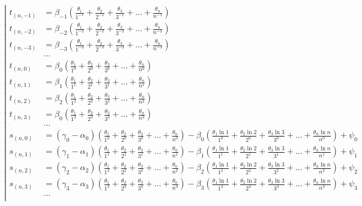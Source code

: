 \begin{equation*} \left| \begin{aligned}
t_{(n,-1)} &=
  \beta_{-1} \left(
  \frac{\theta_1}{1^{-1}}
+ \frac{\theta_2}{2^{-1}}
+ \frac{\theta_3}{3^{-1}}
+ \ldots
+ \frac{\theta_n}{n^{-1}} \right) \\
%
t_{(n,-2)} &=
  \beta_{-2} \left(
  \frac{\theta_1}{1^{-2}}
+ \frac{\theta_2}{2^{-2}}
+ \frac{\theta_3}{3^{-2}}
+ \ldots
+ \frac{\theta_n}{n^{-2}} \right) \\
%
t_{(n,-3)} &=
  \beta_{-3} \left(
  \frac{\theta_1}{1^{-3}}
+ \frac{\theta_2}{2^{-3}}
+ \frac{\theta_3}{3^{-3}}
+ \ldots
+ \frac{\theta_n}{n^{-3}} \right) \\
%
&\ldots \\
%
t_{(n,0)} &=
  \beta_0 \left(
  \frac{\theta_1}{1^0}
+ \frac{\theta_2}{2^0}
+ \frac{\theta_3}{3^0}
+ \ldots
+ \frac{\theta_n}{n^0} \right) \\
%
t_{(n,1)} &=
  \beta_1 \left(
  \frac{\theta_1}{1^1}
+ \frac{\theta_2}{2^1}
+ \frac{\theta_3}{3^1}
+ \ldots
+ \frac{\theta_n}{n^1} \right) \\
%
t_{(n,2)} &=
  \beta_2 \left(
  \frac{\theta_1}{1^2}
+ \frac{\theta_2}{2^2}
+ \frac{\theta_3}{3^2}
+ \ldots
+ \frac{\theta_n}{n^2} \right) \\
%
t_{(n,3)} &=
  \beta_0 \left(
  \frac{\theta_1}{1^3}
+ \frac{\theta_2}{2^3}
+ \frac{\theta_3}{3^3}
+ \ldots
+ \frac{\theta_n}{n^3} \right) \\
%
&\ldots \\
%
s_{(n,0)} &=
  (\gamma_0 - \alpha_0) \left(
  \frac{\theta_1}{1^0}
+ \frac{\theta_2}{2^0}
+ \frac{\theta_3}{3^0}
+ \ldots
+ \frac{\theta_n}{n^0} \right)
- \beta_0 \left(
  \frac{\theta_1 \ln{1}}{1^0}
+ \frac{\theta_2 \ln{2}}{2^0}
+ \frac{\theta_3 \ln{3}}{3^0}
+ \ldots
+ \frac{\theta_n \ln{n}}{n^0} \right)
+ \psi_0 \\
%
s_{(n,1)} &=
  (\gamma_1 - \alpha_1) \left(
  \frac{\theta_1}{1^1}
+ \frac{\theta_2}{2^1}
+ \frac{\theta_3}{3^1}
+ \ldots
+ \frac{\theta_n}{n^1} \right)
- \beta_1 \left(
  \frac{\theta_1 \ln{1}}{1^1}
+ \frac{\theta_2 \ln{2}}{2^1}
+ \frac{\theta_3 \ln{3}}{3^1}
+ \ldots
+ \frac{\theta_n \ln{n}}{n^1} \right)
+ \psi_1 \\
%
s_{(n,2)} &=
  (\gamma_2 - \alpha_2) \left(
  \frac{\theta_1}{1^2}
+ \frac{\theta_2}{2^2}
+ \frac{\theta_3}{3^2}
+ \ldots
+ \frac{\theta_n}{n^2} \right)
- \beta_2 \left(
  \frac{\theta_1 \ln{1}}{1^2}
+ \frac{\theta_2 \ln{2}}{2^2}
+ \frac{\theta_3 \ln{3}}{3^2}
+ \ldots
+ \frac{\theta_n \ln{n}}{n^2} \right)
+ \psi_2 \\
%
s_{(n,3)} &=
  (\gamma_3 - \alpha_3) \left(
  \frac{\theta_1}{1^3}
+ \frac{\theta_2}{2^3}
+ \frac{\theta_3}{3^3}
+ \ldots
+ \frac{\theta_n}{n^3} \right)
- \beta_3 \left(
  \frac{\theta_1 \ln{1}}{1^3}
+ \frac{\theta_2 \ln{2}}{2^3}
+ \frac{\theta_3 \ln{3}}{3^3}
+ \ldots
+ \frac{\theta_n \ln{n}}{n^3} \right)
+ \psi_3 \\
%
&\ldots \\
\end{aligned} \right. \end{equation*}